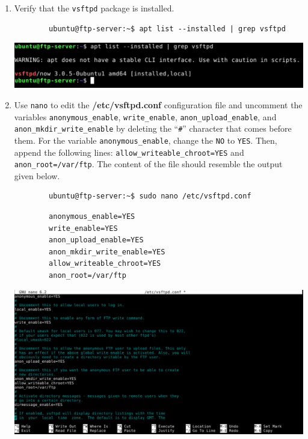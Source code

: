\documentclass[letterpaper, 12pt]{article}
\begin{document}
\begin{enumerate}
    \item Verify that the \texttt{vsftpd} package is installed.
    \begin{lstlisting}
        ubuntu@ftp-server:~$ apt list --installed | grep vsftpd
    \end{lstlisting}

    \begin{center}
        \includegraphics[width=\linewidth]{images/part2/step9.png}
    \end{center}

    \item Use \texttt{nano} to edit the \textbf{/etc/vsftpd.conf} configuration file and uncomment the variables
    \texttt{anonymous\_enable}, \texttt{write\_enable}, \texttt{anon\_upload\_enable}, and
    \texttt{anon\_mkdir\_write\_enable} by deleting the ``\texttt{\#}'' character that comes before them. For
    the variable \texttt{anonymous\_enable}, change the \texttt{NO} to \texttt{YES}. Then, append the following lines:
    \texttt{allow\_writeable\_chroot=YES} and \texttt{anon\_root=/var/ftp}. The content of the file should resemble the
    output given below.
    \begin{lstlisting}
        ubuntu@ftp-server:~$ sudo nano /etc/vsftpd.conf
    \end{lstlisting}
    \begin{lstlisting}
        anonymous_enable=YES
        write_enable=YES
        anon_upload_enable=YES
        anon_mkdir_write_enable=YES
        allow_writeable_chroot=YES
        anon_root=/var/ftp
    \end{lstlisting}

    \begin{center}
        \includegraphics[width=\linewidth]{images/part2/step10.png}
    \end{center}


\end{enumerate}
\end{document}
